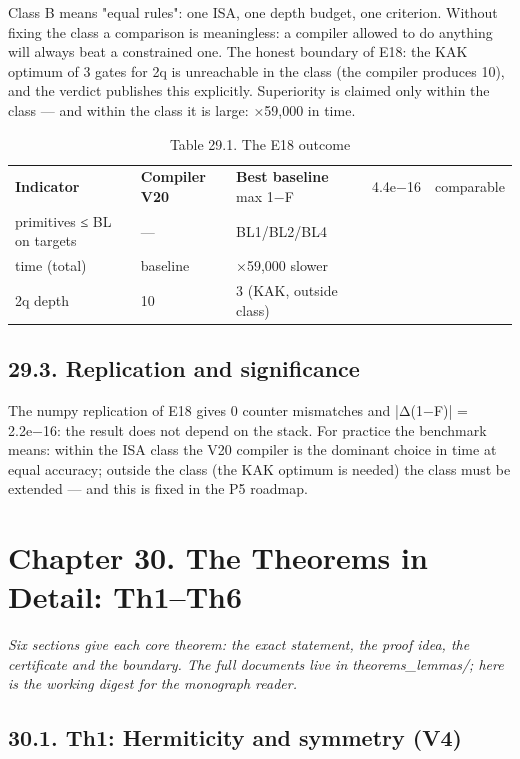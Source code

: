 \documentclass[11pt,a4paper]{article}
\begin{document}
Class B means "equal rules": one ISA, one depth budget, one criterion. Without fixing the class a comparison is meaningless: a compiler allowed to do anything will always beat a constrained one. The honest boundary of E18: the KAK optimum of 3 gates for 2q is unreachable in the class (the compiler produces 10), and the verdict publishes this explicitly. Superiority is claimed only within the class — and within the class it is large: ×59,000 in time.

\begin{table}[htbp]\centering\small
\caption{Table 29.1. The E18 outcome}
\begin{tabular}{p{} p{} p{}}
\toprule
\textbf{Indicator} & \textbf{Compiler V20} & \textbf{Best baseline}
\midrule
max 1−F & 4.4e−16 & comparable \\
primitives ≤ BL on targets & — & BL1/BL2/BL4 \\
time (total) & baseline & ×59,000 slower \\
2q depth & 10 & 3 (KAK, outside class) \\
\bottomrule
\end{tabular}
\end{table}

\subsection{29.3. Replication and significance}

The numpy replication of E18 gives 0 counter mismatches and |Δ(1−F)| = 2.2e−16: the result does not depend on the stack. For practice the benchmark means: within the ISA class the V20 compiler is the dominant choice in time at equal accuracy; outside the class (the KAK optimum is needed) the class must be extended — and this is fixed in the P5 roadmap.

\section{Chapter 30. The Theorems in Detail: Th1–Th6}

\noindent\textit{\color{copper}Six sections give each core theorem: the exact statement, the proof idea, the certificate and the boundary. The full documents live in theorems\_lemmas/; here is the working digest for the monograph reader.}

\subsection{30.1. Th1: Hermiticity and symmetry (V4)}
\end{document}
